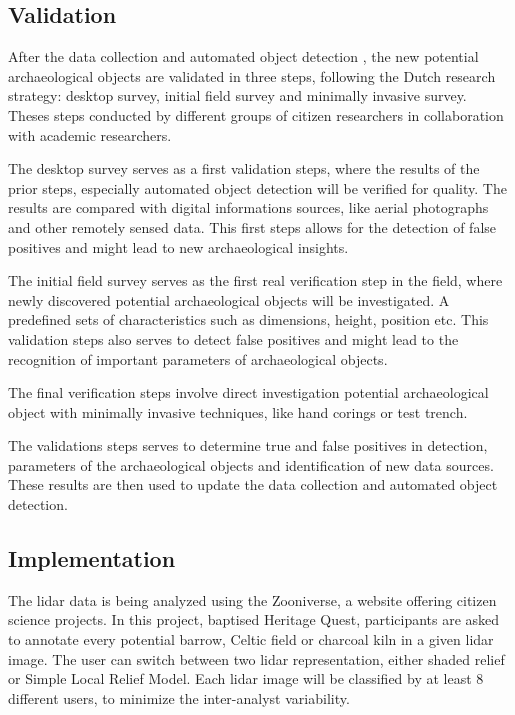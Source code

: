 \subsection{Validation}
After the data collection and automated object detection , the new potential archaeological objects are validated in three steps, following the Dutch research strategy: desktop survey, initial field survey and minimally invasive survey. Theses steps conducted by different groups of citizen researchers in collaboration with academic researchers. 

The desktop survey serves as a first validation steps, where the results of the prior steps, especially automated object detection will be verified for quality. The results are compared with digital informations sources, like aerial photographs and other remotely sensed data. This first steps allows for the detection of false positives and might lead to new archaeological insights.

The initial field survey serves as the first real verification step in the field, where newly discovered potential archaeological objects will be investigated. A predefined sets of characteristics such as dimensions, height, position etc. This validation steps also serves to detect false positives and might lead to the recognition of important parameters of archaeological objects. 

The final verification steps involve direct investigation potential archaeological object with minimally invasive techniques, like hand corings or test trench.  

The validations steps serves to determine true and false positives in detection, parameters of the archaeological objects and identification of new data sources. These results are then used to update the data collection and automated object detection. 

\subsection{Implementation}
The \gls{lidar} data is being analyzed using the Zooniverse, a website offering citizen science projects. In this project, baptised Heritage Quest, participants are asked to annotate every potential barrow, Celtic field or charcoal kiln in a given \gls{lidar} image. The user can switch between two \gls{lidar} representation, either shaded relief or Simple Local Relief Model. Each \gls{lidar} image will be classified by at least 8 different users, to minimize the inter-analyst variability. 

